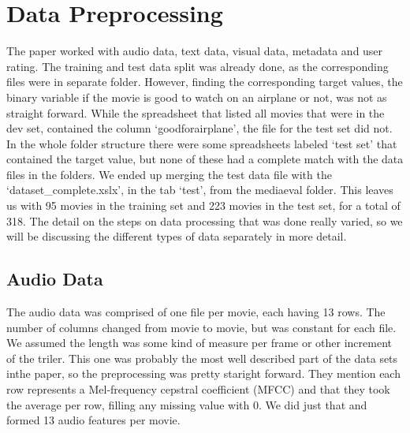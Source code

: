 \documentclass[sigconf]{acmart}
\begin{document}




\maketitle

\section{Data Preprocessing}
The paper worked with audio data, text data, visual data, metadata and user rating. The training and test data split was already done, as the corresponding files were in separate folder. However, finding the corresponding target values, the binary variable if the movie is good to watch on an airplane or not, was not as straight forward. While the spreadsheet that listed all movies that were in the dev set, contained the column \lq goodforairplane\rq, the file for the test set did not. In the whole folder structure there were some spreadsheets labeled ‘test set’ that contained the target value, but none of these had a complete match with the data files in the folders. We ended up merging the test data file with the \lq dataset\_complete.xslx\rq , in the tab \lq test\rq, from the mediaeval folder. This leaves us with 95 movies in the training set and 223 movies in the test set, for a total of 318. The detail on the steps on data processing that was done really varied, so we will be discussing the different types of data separately in more detail.

\subsection{Audio Data}
The audio data was comprised of one file per movie, each having 13 rows. The number of columns changed from movie to movie, but was constant for each file. We assumed the length was some kind of measure per frame or other increment of the triler. This one was probably the most well described part of the data sets inthe paper, so the preprocessing was pretty staright forward. They mention each row represents a Mel-frequency cepstral coefficient (MFCC) and that they took the average per row, filling any missing value with 0. We did just that and formed 13 audio features per movie.
\end{document}
